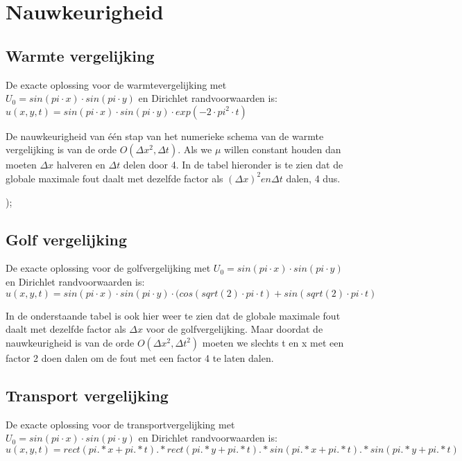 \documentclass[11pt]{article} %
\begin{document}
\section{Nauwkeurigheid}


	\subsection{Warmte vergelijking}
De exacte oplossing voor de warmtevergelijking met $U_0=sin(pi\cdot x)\cdot sin(pi \cdot y)$ en Dirichlet randvoorwaarden is: $u(x,y,t)= sin(pi\cdot x)\cdot sin(pi\cdot y)\cdot exp(-2\cdot pi^2\cdot t) $ 
	
	De nauwkeurigheid van één stap van het numerieke schema van de warmte vergelijking is van de orde $O(\Delta x^2 , \Delta t) $. Als we $\mu$ willen constant houden dan moeten $\Delta x $ halveren en $ \Delta t$ delen door 4. In de tabel hieronder is te zien dat de globale maximale fout daalt met dezelfde factor als $(\Delta x)^2 en \Delta t$ dalen, 4 dus.  
	
		\begin{center}
			
		\end{center}
	);
	
	\subsection{Golf vergelijking}
	De exacte oplossing voor de golfvergelijking met $U_0=sin(pi\cdot x)\cdot sin(pi \cdot y)$ en Dirichlet randvoorwaarden is: $u(x,y,t)= sin(pi \cdot x)\cdot sin(pi\cdot y) \cdot (cos(sqrt(2)\cdot pi \cdot t)+sin(sqrt(2) \cdot pi\cdot t) $ 
	
In de onderstaande tabel is ook hier weer te zien dat de globale maximale fout daalt met dezelfde factor als $\Delta x$ voor de golfvergelijking. Maar doordat de nauwkeurigheid is van de orde $O(\Delta x^2 , \Delta t^2)$ moeten we slechts t en x met een factor 2 doen dalen om de fout met een factor 4 te laten dalen.
		\begin{center}
			
		\end{center}
	\subsection{Transport vergelijking}
	De exacte oplossing voor de transportvergelijking met $U_0=sin(pi\cdot x)\cdot sin(pi \cdot y)$ en Dirichlet randvoorwaarden is: $u(x,y,t)= rect(pi.*x+pi.*t).*rect(pi.*y+pi.*t).*sin(pi.*x+pi.*t).*sin(pi.*y+pi.*t) $ 
	
\end{document}
